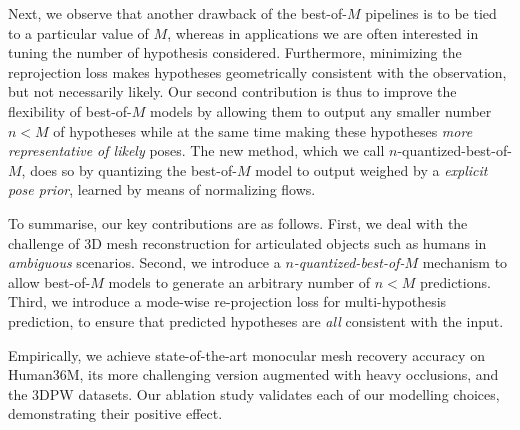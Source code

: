 Next, we observe that another drawback of the best-of-{$M$} pipelines is to be tied to a particular value of $M$, whereas in applications we are often interested in tuning the number of hypothesis considered.
Furthermore, minimizing the reprojection loss makes hypotheses geometrically consistent with the observation, but not necessarily likely.
Our second contribution is thus to improve the flexibility of best-of-$M$ models by allowing them to output any smaller number $n<M$ of hypotheses while at the same time making these hypotheses \emph{more representative of likely} poses.
The new method, which we call $n$-quantized-best-of-$M$, does so by quantizing the best-of-$M$ model to output weighed by a \emph{explicit pose prior}, learned by means of normalizing flows.




To summarise, our key contributions are as follows.
First, we deal with the challenge of 3D mesh reconstruction for articulated objects such as humans in \emph{ambiguous} scenarios.
Second, we introduce a \emph{$n$-quantized-best-of-$M$} mechanism to allow best-of-$M$ models to generate an arbitrary number of $n<M$ predictions.
Third, we introduce a mode-wise re-projection loss for multi-hypothesis prediction, to ensure that predicted hypotheses are \emph{all} consistent with the input.

Empirically, we achieve state-of-the-art monocular mesh recovery accuracy on Human36M, its more challenging version augmented with heavy occlusions, and the 3DPW datasets.
Our ablation study validates each of our modelling choices, demonstrating their positive effect.
